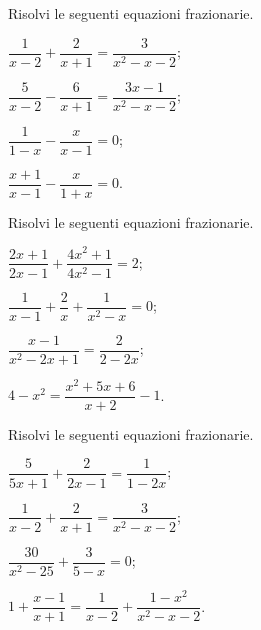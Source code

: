\begin{esercizio}[\Ast]
\label{ese:17.19}
Risolvi le seguenti equazioni frazionarie.
\begin{multicols}{2}
\begin{enumeratea}
\spazielenx
 \item $\dfrac{1}{x-2}+\dfrac{2}{x+1}=\dfrac{3}{x^{2}-x-2}$;
 \item $\dfrac{5}{x-2}-\dfrac{6}{x+1}=\dfrac{3x-1}{x^{2}-x-2}$;
 \item $\dfrac{1}{1-x}-\dfrac{x}{x-1}=0$;
 \item $\dfrac{x+1}{x-1}-\dfrac{x}{1+x}=0$.
\end{enumeratea}
\end{multicols}
\end{esercizio}

\begin{esercizio}[\Ast]
\label{ese:17.20}
Risolvi le seguenti equazioni frazionarie.
\begin{multicols}{2}
\begin{enumeratea}
\spazielenx
 \item $\dfrac{2x+1}{2x-1}+\dfrac{4x^{2}+1}{4x^{2}-1}=2$;
 \item $\dfrac{1}{x-1}+\dfrac{2}{x}+\dfrac{1}{x^{2}-x}=0$;
 \item $\dfrac{x-1}{x^{2}-2x+1}=\dfrac{2}{2-2x}$;
 \item $4-x^{2}=\dfrac{x^{2}+5x+6}{x+2}-1$.
\end{enumeratea}
\end{multicols}
\end{esercizio}

\begin{esercizio}[\Ast]
\label{ese:17.21}
Risolvi le seguenti equazioni frazionarie.
\begin{multicols}{2}
\begin{enumeratea}
\spazielenx
 \item $\dfrac{5}{5x+1}+\dfrac{2}{2x-1}=\dfrac{1}{1-2x}$;
 \item $\dfrac{1}{x-2}+\dfrac{2}{x+1}=\dfrac{3}{x^{2}-x-2}$;
 \item $\dfrac{30}{x^{2}-25}+\dfrac{3}{5-x}=0$;
 \item $1+\dfrac{x-1}{x+1}=\dfrac{1}{x-2}+\dfrac{1-x^{2}}{x^{2}-x-2}$.
\end{enumeratea}
\end{multicols}
\end{esercizio}

